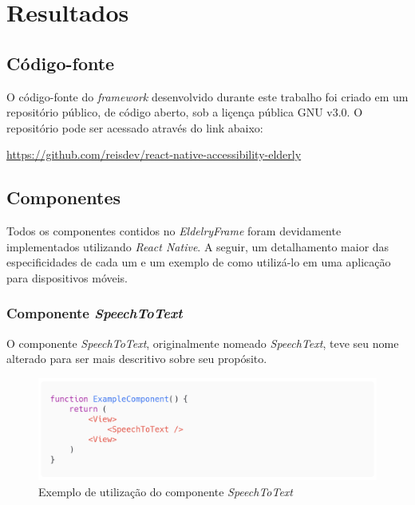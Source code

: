 \documentclass[
	12pt,				    %
	openright,			    %
	oneside,			    %
	a4paper,			    %
    sumario=tradicional,    %
	english,			    %
	brazil,				    %
	]{abntex2}              %
\begin{document}
\chapter{Resultados}\label{sec:resultados}

\section{Código-fonte}

O código-fonte do \textit{framework} desenvolvido durante este trabalho foi criado em um repositório público, de código aberto, sob a liçença pública GNU v3.0. O repositório pode ser acessado através do link abaixo:

\href{https://github.com/reisdev/react-native-accessibility-elderly}{https://github.com/reisdev/react-native-accessibility-elderly}

\section{Componentes}

Todos os componentes contidos no \textit{EldelryFrame} foram devidamente implementados utilizando \textit{React Native}. A seguir, um detalhamento maior das especificidades de cada um e um exemplo de como utilizá-lo em uma aplicação para dispositivos móveis.

\subsection{Componente \textit{SpeechToText}}

O componente \textit{SpeechToText}, originalmente nomeado \textit{SpeechText}, teve seu nome alterado para ser mais descritivo sobre seu propósito.

\begin{figure}[H]
	\begin{center}
		\includegraphics[width=.8\linewidth]{images/SpeechToText.png}
		\caption[Componente \textit{SpeechToText}]{Exemplo de utilização do componente \textit{SpeechToText}}
		\label{fig:speechToTextExample}
	\end{center}
\end{figure}
\end{document}
